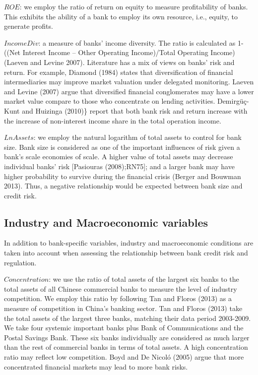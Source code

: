\documentclass{article}
\begin{document}
\(ROE\): we employ the ratio of return on equity to measure
profitability of banks. This exhibits the ability of a bank to employ
its own resource, i.e., equity, to generate profits.

\(Income Div\): a measure of banks' income diversity. The ratio is
calculated as 1-((Net Interest Income -- Other Operating Income)/Total
Operating Income) (Laeven and Levine 2007). Literature has a mix of
views on banks' risk and return. For example, Diamond (1984) states that
diversification of financial intermediaries may improve market valuation
under delegated monitoring. Laeven and Levine (2007) argue that
diversified financial conglomerates may have a lower market value
compare to those who concentrate on lending activities. Demirgüç-Kunt
and Huizinga (2010)\} report that both bank risk and return increase
with the increase of non-interest income share in the total operation
income.

\(LnAssets\): we employ the natural logarithm of total assets to control
for bank size. Bank size is considered as one of the important
influences of risk given a bank's scale economies of scale. A higher
value of total assets may decrease individual banks' risk {[}Pasiouras
(2008);RN75{]}; and a larger bank may have higher probability to survive
during the financial crisis (Berger and Bouwman 2013). Thus, a negative
relationship would be expected between bank size and credit risk.

\hypertarget{industry-and-macroeconomic-variables}{%
\subsection{Industry and Macroeconomic
variables}\label{industry-and-macroeconomic-variables}}

In addition to bank-specific variables, industry and macroeconomic
conditions are taken into account when assessing the relationship
between bank credit risk and regulation.

\(Concentration\): we use the ratio of total assets of the largest six
banks to the total assets of all Chinese commercial banks to measure the
level of industry competition. We employ this ratio by following Tan and
Floros (2013) as a measure of competition in China's banking sector. Tan
and Floros (2013) take the total assets of the largest three banks,
matching their data period 2003-2009. We take four systemic important
banks plus Bank of Communications and the Postal Savings Bank. These six
banks individually are considered as much larger than the rest of
commercial banks in terms of total assets. A high concentration ratio
may reflect low competition. Boyd and De Nicoló (2005) argue that more
concentrated financial markets may lead to more bank risks.
\end{document}
